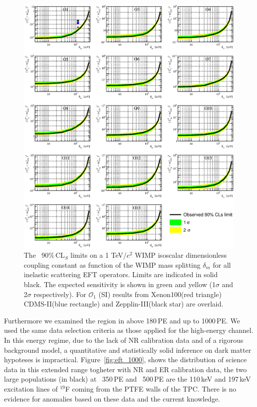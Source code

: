 \begin{figure}
\begin{minipage}{1.\linewidth}
\centerline{\includegraphics[width=\textwidth,height=0.99\textheight,keepaspectratio]{Figures/FinalInelastic.eps}}
\end{minipage}
\caption{The \Xehund\ 90\%\,CL$_S$ limits on a 1 TeV/$c^2$ WIMP isoscalar dimensionless coupling constant as function of the WIMP mass splitting $\delta_m$  for all inelastic scattering EFT operators. Limits are indicated in solid black. The expected sensitivity is shown in green and yellow (1$\sigma$ and 2$\sigma$ respectively). For $\mathcal{O}_1$ (SI) results from Xenon100(red triangle) CDMS-II(blue rectangle) and Zepplin-III(black star) are overlaid.}
\label{fig:InelasticLimit}
\end{figure}

Furthermore we examined the region in \cSi{} above 180\,PE and up to 1000\,PE. We used the same data selection criteria as those applied for the high-energy channel. 
In this energy regime, due to the lack of NR calibration data and of a rigorous background model, a quantitative and statistically solid inference on dark
matter hypoteses is impractical. Figure~\ref{fig:eft_1000}, shows the distribution of science data in this extended range togheter with NR and ER calibration data,
the two large populations (in black) at ~350\,PE and ~500\,PE are the 110\,keV and 197\,keV excitation lines of $^{19}$F coming from the PTFE walls of the TPC. 
There is no evidence for anomalies based on these data and the current knowledge.

